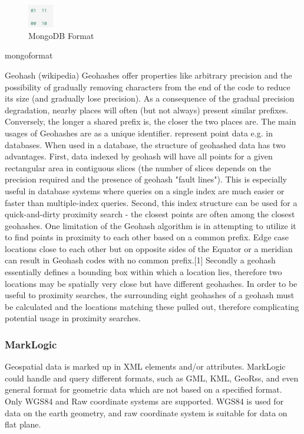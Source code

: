 \documentclass[a4paper,12pt]{article}
\begin{document}
\begin{figure}
\centering
\includegraphics[width=0.1\textwidth]{mongoformat}
\caption{MongoDB Format}
\label{fig}
\end{figure}

mongoformat

Geohash (wikipedia)
Geohashes offer properties like arbitrary precision and the possibility of gradually removing characters from the end of the code to reduce its size (and gradually lose precision).
As a consequence of the gradual precision degradation, nearby places will often (but not always) present similar prefixes. Conversely, the longer a shared prefix is, the closer the two places are.
The main usages of Geohashes are
as a unique identifier.
represent point data e.g. in databases.
When used in a database, the structure of geohashed data has two advantages. First, data indexed by geohash will have all points for a given rectangular area in contiguous slices (the number of slices depends on the precision required and the presence of geohash "fault lines"). This is especially useful in database systems where queries on a single index are much easier or faster than multiple-index queries. Second, this index structure can be used for a quick-and-dirty proximity search - the closest points are often among the closest geohashes.
One limitation of the Geohash algorithm is in attempting to utilize it to find points in proximity to each other based on a common prefix. Edge case locations close to each other but on opposite sides of the Equator or a meridian can result in Geohash codes with no common prefix.[1]
Secondly a geohash essentially defines a bounding box within which a location lies, therefore two locations may be spatially very close but have different geohashes. In order to be useful to proximity searches, the surrounding eight geohashes of a geohash must be calculated and the locations matching these pulled out, therefore complicating potential usage in proximity searches.

\subsubsection{MarkLogic}
Geospatial data is marked up in XML elements and/or attributes. MarkLogic could handle and query different formats, such as GML, KML, GeoRss, and even general format for geometric data which are not based on a specified format. Only WGS84 and Raw coordinate systems are supported. WGS84 is used for data on the earth geometry, and raw coordinate system is suitable for data on flat plane.
\end{document}
